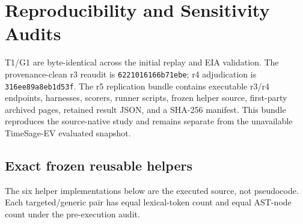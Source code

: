 \section{Reproducibility and Sensitivity Audits}
T1/G1 are byte-identical across the initial replay and EIA validation. The provenance-clean r3 reaudit is \texttt{6221016166b71ebe}; r4 adjudication is \texttt{316ee89a8eb1d53f}. The r5 replication bundle contains executable r3/r4 endpoints, harnesses, scorers, runner scripts, frozen helper source, first-party archived pages, retained result JSON, and a SHA-256 manifest. This bundle reproduces the source-native study and remains separate from the unavailable TimeSage-EV evaluated snapshot.

\subsection{Exact frozen reusable helpers}
The six helper implementations below are the executed source, not pseudocode. Each targeted/generic pair has equal lexical-token count and equal AST-node count under the pre-execution audit.

